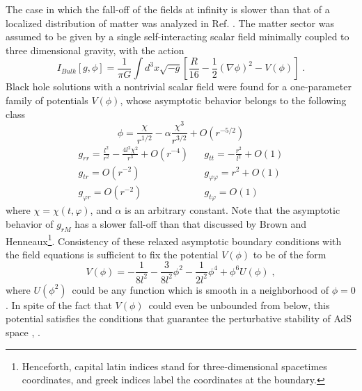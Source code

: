 \documentclass[a4paper,12pt]{article}
\begin{document}
The case in which the fall-off of the fields at infinity is slower than that
of a localized distribution of matter was analyzed in Ref. \cite{HMTZ}. The
matter sector was assumed to be given by a single self-interacting scalar
field minimally coupled to three dimensional gravity, with the action 
\begin{equation}
I_{Bulk}[g,\phi ]=\frac{1}{\pi G}\int d^{3}x\sqrt{-g}\left[ \frac{R}{16}-%
\frac{1}{2}(\nabla \phi )^{2}-V(\phi )\right] \;.  \label{Action Bulk}
\end{equation}
Black hole solutions with a nontrivial scalar field were found for a
one-parameter family of potentials $V(\phi )$, whose asymptotic behavior
belongs to the following class 
\begin{equation}
\phi =\frac{\chi }{r^{1/2}}-\alpha \frac{\chi ^{3}}{r^{3/2}}+O(r^{-5/2})
\label{AsymptPhi}
\end{equation}
\begin{equation}
\begin{array}{lll}
g_{rr}=\displaystyle \frac{l^{2}}{r^{2}}-\frac{4l^{2}\chi ^{2}}{r^{3}}%
+O(r^{-4}) &  & \displaystyle g_{tt}=-\frac{r^{2}}{l^{2}}+O(1) \\[2mm]
g_{tr}=O(r^{-2}) &  & g_{\varphi \varphi }=r^{2}+O(1) \\[1mm]
g_{\varphi r}=O(r^{-2}) &  & g_{t\varphi }=O(1)
\end{array}
\label{AsymptGeneral}
\end{equation}
where $\chi =\chi (t,\varphi )$, and $\alpha $ is an arbitrary constant.
Note that the asymptotic behavior of $g_{rM}$ has a slower fall-off than that 
discussed 
by Brown and Henneaux\footnote{%
Henceforth, capital latin indices stand for three-dimensional spacetimes
coordinates, and greek indices label the coordinates at the boundary.}.
Consistency of these relaxed asymptotic boundary conditions with the field
equations is sufficient to fix the potential $V(\phi )$ to be of the form 
\begin{equation}
V(\phi )=-\frac{1}{8l^{2}}-\frac{3}{8l^{2}}\phi ^{2}-\frac{1}{2l^{2}}\phi
^{4}+\phi ^{6}U(\phi )\;,  \label{Generic Potential}
\end{equation}
where $U(\phi ^{2})$\ could be any function which is smooth in a
neighborhood of $\phi =0$. In spite of the fact that $V(\phi )$\ could even
be unbounded from below, this potential satisfies the conditions that
guarantee the perturbative stability of AdS space \cite{B-F}, \cite{M-T}.
\end{document}
